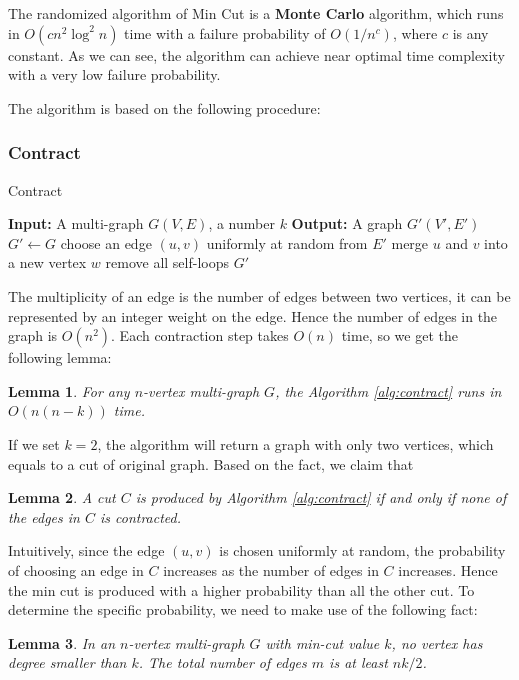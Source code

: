 \documentclass[12pt]{article}
\theoremstyle{plain}
\newtheorem{lemma}{Lemma}[section]
\begin{document}
The randomized algorithm of Min Cut is a \textbf{Monte Carlo} algorithm, which runs in $O(cn^2\log^2 n)$ time with a failure probability of $O(1/n^c)$, where $c$ is any constant. As we can see, the algorithm can achieve near optimal time complexity with a very low failure probability.

The algorithm is based on the following procedure:
\subsubsection{Contract}
\begin{algorithm}
\caption{Contract}
\label{alg:contract}
\begin{algorithmic}
    \STATE \textbf{Input:} A multi-graph $G(V,E)$, a number $k$
    \STATE \textbf{Output:} A graph $G'(V',E')$
    \STATE $G'\leftarrow G$
    \STATE choose an edge $(u,v)$ uniformly at random from $E'$
    \STATE merge $u$ and $v$ into a new vertex $w$
    \STATE remove all self-loops
    \ENDWHILE
    \RETURN $G'$
\end{algorithmic}
\end{algorithm}
The multiplicity of an edge is the number of edges between two vertices, it can be represented by an integer weight on the edge. Hence the number of edges in the graph is $O(n^2)$. Each contraction step takes $O(n)$ time, so we get the following lemma:

\begin{lemma}
    \label{lemma:9}
    For any $n$-vertex multi-graph $G$, the Algorithm \ref{alg:contract} runs in $O(n(n-k))$ time.
\end{lemma}

If we set $k=2$, the algorithm will return a graph with only two vertices, which equals to a cut of original graph. Based on the fact, we claim that

\begin{lemma}
    \label{lemma:cut}
    A cut $C$ is produced by Algorithm \ref{alg:contract} if and only if none of the edges in $C$ is contracted.
\end{lemma}

Intuitively, since the edge $(u,v)$ is chosen uniformly at random, the probability of choosing an edge in $C$ increases as the number of edges in $C$ increases. Hence the min cut is produced with a higher probability than all the other cut. To determine the specific probability, we need to make use of the following fact:

\begin{lemma}
    \label{lemma:degree}
    In an $n$-vertex multi-graph $G$ with min-cut value $k$, no vertex has degree smaller than $k$. The total number of edges $m$ is at least $nk/2$.
\end{lemma}
\end{document}
